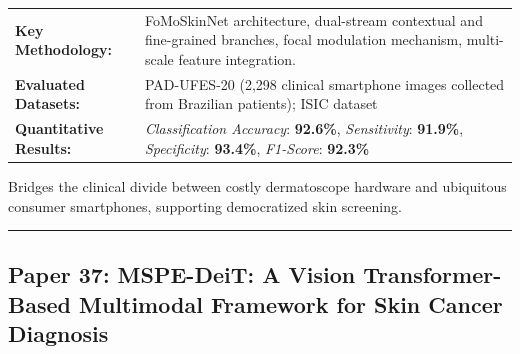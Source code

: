 \documentclass[10pt,a4paper]{article}
\begin{document}
\vspace{4pt}
\begin{tabularx}{\linewidth}{p{3.2cm}X}
\toprule
\textbf{Key Methodology:} & FoMoSkinNet architecture, dual-stream contextual and fine-grained branches, focal modulation mechanism, multi-scale feature integration. \\
\textbf{Evaluated Datasets:} & PAD-UFES-20 (2,298 clinical smartphone images collected from Brazilian patients); ISIC dataset \\
\textbf{Quantitative Results:} & \textit{Classification Accuracy}: \textbf{92.6\%}, \textit{Sensitivity}: \textbf{91.9\%}, \textit{Specificity}: \textbf{93.4\%}, \textit{F1-Score}: \textbf{92.3\%} \\
\bottomrule
\end{tabularx}
\vspace{4pt}
\begin{tcolorbox}[utilitybox,title=Clinical Utility and Real-World Impact]
Bridges the clinical divide between costly dermatoscope hardware and ubiquitous consumer smartphones, supporting democratized skin screening.
\end{tcolorbox}
\vspace{12pt}
\hrule
\vspace{12pt}
\subsection*{Paper 37: MSPE-DeiT: A Vision Transformer-Based Multimodal Framework for Skin Cancer Diagnosis}
\end{document}
